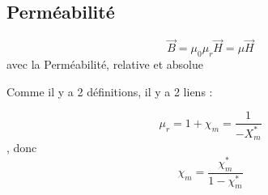 \documentclass[french]{yLectureNote}
\renewcommand{\vec}{\overrightarrow}
\begin{document}
\subsection{Perméabilité}
\begin{definition}[Perméabilité]
    $$\vec{B} = \mu_0\mu_r \vec{H} = \mu\vec{H}$$ avec la Perméabilité, relative et absolue
\end{definition}
Comme il y a 2 définitions, il y a 2 liens :
\begin{definition}[Expression de $\mu_r$]
    $$\mu_r = 1+\chi_m = \frac{1}{-X_m^*}$$, donc $$\chi_m = \frac{\chi_m^*}{1-\chi_m^*}$$
\end{definition}


\end{document}
